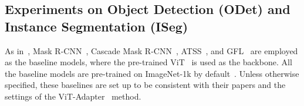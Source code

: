 \subsection{Experiments on Object Detection (ODet) and Instance Segmentation (ISeg)}
\label{sec4:2}
 As in~\citep{chen2022vision,xiong2024efficient,jie2022convolutional,marouf2024mini}, Mask R-CNN~\citep{he2017mask}, Cascade Mask R-CNN~\citep{cai2019cascade}, ATSS~\citep{zhang2020bridging}, and GFL~\citep{li2020generalized} are employed as the baseline models, where the pre-trained ViT~\citep{li2022exploring} is used as the backbone. All the baseline models are pre-trained on ImageNet-1k by default~\citep{deng2009imagenet}. Unless otherwise specified, these baselines are set up to be consistent with their papers and the settings of the ViT-Adapter~\citep{chen2022vision} method.


